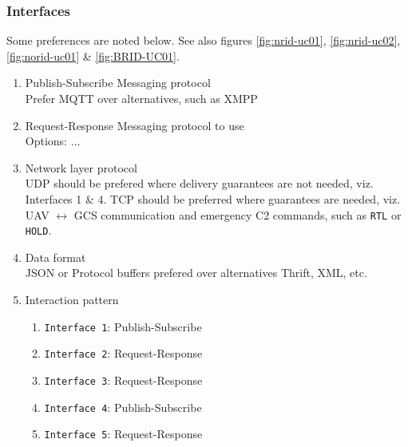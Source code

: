 \documentclass{ua_wgs_base}
\begin{document}
\subsubsection{Interfaces}
Some preferences are noted below. See also figures \ref{fig:nrid-uc01}, \ref{fig:nrid-uc02}, \ref{fig:norid-uc01} \& \ref{fig:BRID-UC01}.

\begin{enumerate}
  \item Publish-Subscribe Messaging protocol \\
  Prefer MQTT over alternatives, such as XMPP
  \item Request-Response Messaging protocol to use \\
  Options: $\ldots$
  \item Network layer protocol \\
  UDP should be prefered where delivery guarantees are not needed, viz. Interfaces 1 \& 4. TCP should be preferred where guarantees are needed, viz. UAV $\leftrightarrow$ GCS communication and emergency C2 commands, such as \texttt{RTL} or \texttt{HOLD}.
  \item Data format \\
  JSON or Protocol buffers prefered over alternatives Thrift, XML, etc.
  \item Interaction pattern \\
  \begin{enumerate}
    \item \texttt{Interface 1}: Publish-Subscribe
    \item \texttt{Interface 2}: Request-Response
    \item \texttt{Interface 3}: Request-Response
    \item \texttt{Interface 4}: Publish-Subscribe
    \item \texttt{Interface 5}: Request-Response
  \end{enumerate}
\end{enumerate}
\end{document}
